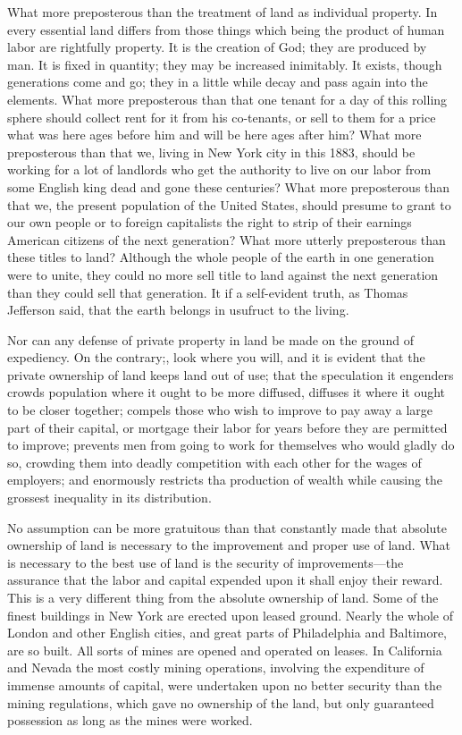 \documentclass{book}
\begin{document}
What more preposterous than the treatment of land as individual property. In every essential land differs from those things which being the product of human labor are rightfully property. It is the creation of God; they are produced by man. It is fixed in quantity; they may be increased inimitably. It exists, though generations come and go; they in a little while decay and pass again into the elements. What more preposterous than that one tenant for a day of this rolling sphere should collect rent for it from his co-tenants, or sell to them for a price what was here ages before him and will be here ages after him? What more preposterous than that we, living in New York city in this 1883, should be working for a lot of landlords who get the authority to live on our labor from some English king dead and gone these centuries? What more preposterous than that we, the present population of the United States, should presume to grant to our own people or to foreign capitalists the right to strip of their earnings American citizens of the next generation? What more utterly preposterous than these titles to land? Although the whole people of the earth in one generation were to unite, they could no more sell title to land against the next generation than they could sell that generation. It if a self-evident truth, as Thomas Jefferson said, that the earth belongs in usufruct to the living.

Nor can any defense of private property in land be made on the ground of expediency. On the contrary;, look where you will, and it is evident that the private ownership of land keeps land out of use; that the speculation it engenders crowds population where it ought to be more diffused, diffuses it where it ought to be closer together; compels those who wish to improve to pay away a large part of their capital, or mortgage their labor for years before they are permitted to improve; prevents men from going to work for themselves who would gladly do so, crowding them into deadly competition with each other for the wages of employers; and enormously restricts tha production of wealth while causing the grossest inequality in its distribution.

No assumption can be more gratuitous than that constantly made that absolute ownership of land is necessary to the improvement and proper use of land. What is necessary to the best use of land is the security of improvements—the assurance that the labor and capital expended upon it shall enjoy their reward. This is a very different thing from the absolute ownership of land. Some of the finest buildings in New York are erected upon leased ground. Nearly the whole of London and other English cities, and great parts of Philadelphia and Baltimore, are so built. All sorts of mines are opened and operated on leases. In California and Nevada the most costly mining operations, involving the expenditure of immense amounts of capital, were undertaken upon no better security than the mining regulations, which gave no ownership of the land, but only guaranteed possession as long as the mines were worked.
\end{document}
